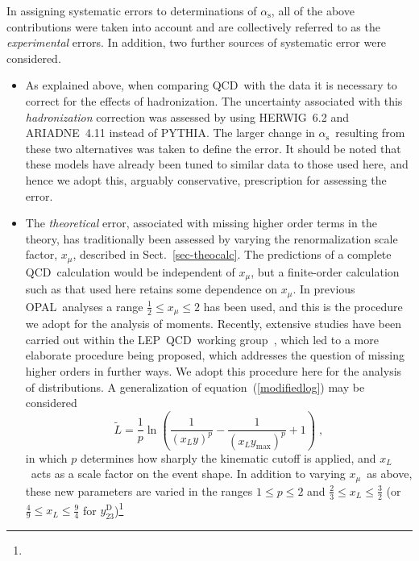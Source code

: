 \documentclass[12pt,a4paper,twoside]{article}
\newcommand{\as}     {\ensuremath{\alpha_{\mathrm{s}}}}
\newcommand{\ecm}   {\ensuremath{E_{\mathrm{c.m.}}}}
\newcommand{\xmu}    {\ensuremath{x_{\mu}}}
\newcommand{\xl}     {\ensuremath{x_{\scriptscriptstyle L}}}
\newcommand{\ytwothree}   {\ensuremath{y^{\mathrm{D}}_{23}}}
\newcommand{\Opal}{\mbox{\rm OPAL}}
\newcommand{\Lep}{\mbox{LEP}}
\newcommand{\qcd}{\mbox{QCD}}
\newcommand{\nlo}{\mbox{NLO}}
\newcommand{\Herwig}{\mbox{HERWIG}}
\newcommand{\Pythia}{\mbox{PYTHIA}}
\newcommand{\Ariadne}{\mbox{ARIADNE}}
\begin{document}
In assigning systematic errors to determinations of \as, 
all of the above contributions were taken into account
and are collectively referred to as the {\em experimental} errors.
In addition, two further sources of systematic error were
considered. 
\begin{itemize}
\item As explained above, 
when comparing \qcd\ with the data it is necessary to correct for
the effects of hadronization. The uncertainty associated with this 
{\em hadronization} correction
was assessed by using \Herwig~6.2 and \Ariadne~4.11 instead
of \Pythia.  The larger change in \as\ resulting from these two 
alternatives was taken to define the error.  It should be noted that
these models have already been tuned to similar data to those used here, 
and hence we adopt this, arguably conservative, prescription 
for assessing the error. 
\item The {\em theoretical} error, associated with missing higher order
terms in the theory, has traditionally been assessed by varying the 
renormalization scale factor, $\xmu$, 
described in Sect.~\ref{sec-theocalc}.
The predictions of a complete \qcd\ calculation 
would be independent of \xmu, 
but a finite-order calculation such as that used here retains some 
dependence on \xmu.  In previous \Opal\ analyses a range
$\frac{1}{2}\le\xmu\le2$ has been used, and this is the
procedure we adopt for the analysis of moments.   
Recently, extensive studies 
have been carried out within 
the \Lep\ \qcd\ working group~\cite{LEPQCDWG1}, 
which led to a more elaborate procedure being proposed, which
addresses the question of missing higher orders in further ways.
We adopt this procedure here for the analysis of distributions.  
A generalization of equation~(\ref{modifiedlog}) may be considered
\begin{equation}
\widetilde{L}= \frac{1}{p}
\ln \left(\frac{1}{{(\xl y)}^p}-\frac{1}{{(\xl y_\mathrm{max})}^p}+1\right)\;,
\end{equation}
in which $p$ determines how sharply the kinematic cutoff is applied, and
\xl\ acts as a scale factor on the event shape.
In addition to varying \xmu\ as above, these new parameters are varied in the
ranges $1\le p \le 2$ and $\frac{2}{3} \le \xl \le \frac{3}{2}$ 
(or $\frac{4}{9} \le \xl \le \frac{9}{4}$ for \ytwothree)\footnote{
}
\end{itemize}
\end{document}
